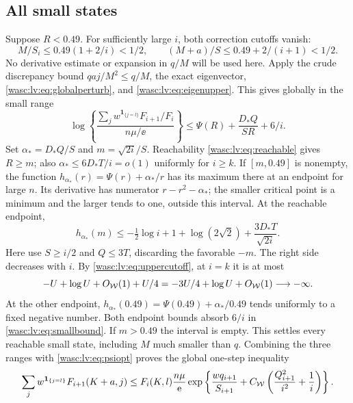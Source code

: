 \documentclass[11pt,a4paper]{article}
\theoremstyle{remark}\newtheorem{remark}[theorem]{Remark}
\newcommand{\ind}{\mathbf 1}\newcommand{\wasc}{\operatorname{wasc}}\newcommand{\dasc}{\operatorname{dasc}}
\numberwithin{equation}{section}
\begin{document}
\subsection{All small states}
Suppose $R<0.49$. For sufficiently large $i$, both correction cutoffs vanish:
\begin{equation}\label{wasc:lv:eq:cutoffzero}
M/S_i\le0.49(1+2/i)<1/2,\qquad (M+a)/S\le0.49+2/(i+1)<1/2.
\end{equation}
No derivative estimate or expansion in $q/M$ will be used here. Apply the crude discrepancy bound $qaj/M^2\le q/M$, the exact eigenvector, \eqref{wasc:lv:eq:globalperturb}, and \eqref{wasc:lv:eq:eigenupper}. This gives globally in the small range
\begin{equation}\label{wasc:lv:eq:smallbound}
\log\left\{\frac{\sum_j w^{\ind_{\{j=l\}}}F_{i+1}/F_i}{n\mu/\ee}\right\}
\le\Psi(R)+\frac{D_*Q}{SR}+6/i.
\end{equation}
Set $\alpha_*=D_*Q/S$ and $m=\sqrt{2i}/S$. Reachability \eqref{wasc:lv:eq:reachable} gives $R\ge m$; also $\alpha_*\le6D_*T/i=o(1)$ uniformly for $i\ge k$.
If $[m,0.49]$ is nonempty, the function
$h_{\alpha_*}(r)=\Psi(r)+\alpha_*/r$ has its maximum there at an endpoint for large $n$.
Its derivative has numerator $r-r^2-\alpha_*$; the smaller critical point is a minimum and the larger tends to one, outside this interval.
At the reachable endpoint,
\begin{equation}\label{wasc:lv:eq:smallendpoint}
h_{\alpha_*}(m)
\le-\tfrac12\log i+1+\log(2\sqrt2)+\frac{3D_*T}{\sqrt{2i}}.
\end{equation}
Here use $S\ge i/2$ and $Q\le3T$, discarding the favorable $-m$.
The right side decreases with $i$. By \eqref{wasc:lv:eq:uppercutoff}, at $i=k$ it is at most
\[
-U+\log U+O_{\mathcal W}(1)+U/4=-3U/4+\log U+O_{\mathcal W}(1)\longrightarrow-\infty.
\]
At the other endpoint,
$h_{\alpha_*}(0.49)=\Psi(0.49)+\alpha_*/0.49$ tends uniformly to a fixed negative number.
Both endpoint bounds absorb $6/i$ in \eqref{wasc:lv:eq:smallbound}. If $m>0.49$ the interval is empty. This settles every reachable small state, including $M$ much smaller than $q$.
Combining the three ranges with \eqref{wasc:lv:eq:psiopt} proves the global one-step inequality
\begin{equation}\label{wasc:lv:eq:globalstep}
\sum_j w^{\ind_{\{j=l\}}}F_{i+1}(K+a,j)
\le F_i(K,l)\frac{n\mu}{\ee}
\exp\left\{\frac{wq_{i+1}}{S_{i+1}}+
C_{\Wc}\left(\frac{Q_{i+1}^2}{i^2}+\frac1i\right)\right\}.
\end{equation}
\end{document}
